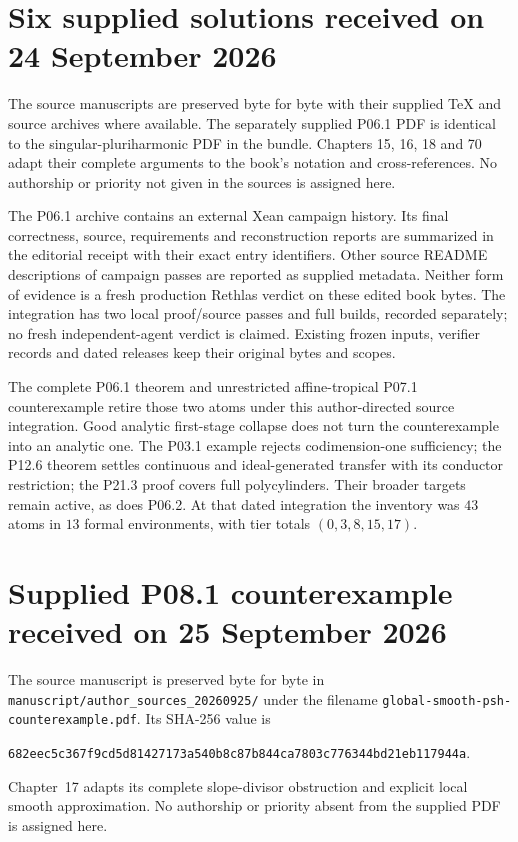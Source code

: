 \section{Six supplied solutions received on 24 September 2026}
\label{sec:provenance-supplied-20260924}

The source manuscripts \cite{SuppliedP06120260924,SuppliedP071Good20260924,%
SuppliedP071Star20260924,SuppliedP03120260924,SuppliedP21320260924,%
SuppliedP12620260924} are preserved byte for byte with their supplied TeX
and source archives where available. The separately supplied P06.1 PDF
is identical to the singular-pluriharmonic PDF in the bundle. Chapters 15,
16, 18 and 70 adapt their complete arguments to the book's notation and
cross-references. No authorship or priority not given in the sources is
assigned here.

The P06.1 archive contains an external Xean campaign history. Its final
correctness, source, requirements and reconstruction reports are summarized
in the editorial receipt with their exact entry identifiers. Other source
README descriptions of campaign passes are reported as supplied metadata.
Neither form of evidence is a fresh production Rethlas verdict on these
edited book bytes. The integration has two local proof/source passes and
full builds, recorded separately; no fresh independent-agent verdict is
claimed. Existing frozen inputs, verifier records and dated releases keep
their original bytes and scopes.

The complete P06.1 theorem and unrestricted affine-tropical P07.1
counterexample retire those two atoms under this author-directed source
integration. Good analytic first-stage collapse does not turn the
counterexample into an analytic one. The P03.1 example rejects
codimension-one sufficiency; the P12.6 theorem settles continuous and
ideal-generated transfer with its conductor restriction; the P21.3 proof
covers full polycylinders. Their broader targets remain active, as does
P06.2. At that dated integration the inventory was \(43\) atoms in \(13\) formal environments,
with tier totals \((0,3,8,15,17)\).

\section{Supplied P08.1 counterexample received on 25 September 2026}
\label{sec:provenance-supplied-p081-20260925}

The source manuscript \cite{SuppliedP08120260925} is preserved byte for byte
in \nolinkurl{manuscript/author_sources_20260925/} under the filename
\nolinkurl{global-smooth-psh-counterexample.pdf}.  Its SHA-256 value is
\begin{center}
\small
\nolinkurl{682eec5c367f9cd5d81427173a540b8c87b844ca7803c776344bd21eb117944a}.
\end{center}
Chapter~17 adapts its complete slope-divisor obstruction and explicit local
smooth approximation.  No authorship or priority absent from the supplied
PDF is assigned here.

